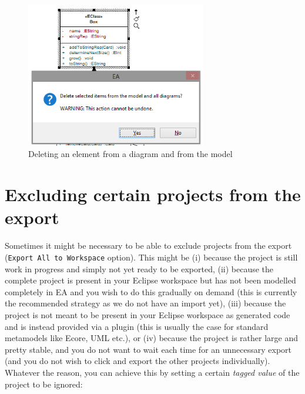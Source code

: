 \begin{enumerate}
\begin{figure}[htbp]
\begin{center}
  \includegraphics[width=0.7\textwidth]{pics/tricks/DelVsCtrlDel/DelVsCtrlDel2.png}
  \caption{Deleting an element from a diagram and from the model}  
  \label{fig_DelVsCtrlDel02}
\end{center}
\end{figure}  

\end{enumerate}

\section{Excluding certain projects from the export}

Sometimes it might be necessary to be able to exclude projects from the export (\texttt{Export All to Workspace} option).
This might be (i) because the project is still work in progress and simply not yet ready to be exported, (ii) because the complete project is present in your Eclipse workspace but has not been modelled completely in EA and you wish to do this gradually on demand (this is currently the recommended strategy as we do not have an import yet), (iii) because the project is not meant to be present in your Eclipse workspace as generated code and is instead provided via a plugin (this is usually the case for standard metamodels like Ecore, UML etc.), or (iv) because the project is rather large and pretty stable, and you do not want to wait each time for an unnecessary export (and you do not wish to click and export the other projects individually).
Whatever the reason, you can achieve this by setting a certain \emph{tagged value} of the project to be ignored:


